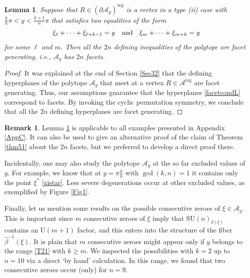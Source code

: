 \documentclass[a4paper,11pt,reqno]{amsart}
\newtheorem{lem}[thm]{Lemma}
\theoremstyle{definition}
\newtheorem{rem}[thm]{Remark}
\numberwithin{equation}{section}
\newcommand{\be}{\begin{equation}}
\newcommand{\ee}{\end{equation}}
\def\cA{{\mathcal A}}                       %
\def\reg{\mathrm{reg}}                      %
\def\SU{\mathrm{SU}}                        %
\def\U{\mathrm{U}}                          %
\def\reg{\mathrm{reg}}                      %
\begin{document}
\begin{lem}\label{facetlemL}
Suppose that $R \in (\partial \cA_y)^\reg$ is a vertex in a type (ii) case with $\frac{k}{n} \pi < y < \frac{k+1}{n}\pi $ that satisfies
two equalities of the form
\be
\xi_\ell+\cdots + \xi_{\ell +k-1} =y
\quad\hbox{and}\quad
\xi_m + \cdots + \xi_{m+k} = y
\label{facetcondL}\ee
for some $\ell$ and $m$. Then all the $2n$ defining inequalities of the polytope are facet generating, i.e., $\cA_y$ has $2n$ facets.
\end{lem}
\begin{proof}
It was explained at the end of Section \ref{Sec32}
that the defining hyperplanes of the polytope $\cA_y$ that meet at a vertex $R\in \cA^\reg$ are facet generating.
Thus, our assumptions   guarantee that the hyperplanes \eqref{facetcondL} correspond to facets.
By invoking the cyclic permutation symmetry, we conclude that all the $2n$ defining hyperplanes are facet generating.
\end{proof}



\begin{rem}
  Lemma \ref{facetlemL} is applicable to all examples presented in Appendix \ref{AppC}.
It can also be used to give an alternative proof of the claim of Theorem \ref{thm51} about the $2n$ facets, but
we preferred to develop a direct proof there.
\end{rem}


Incidentally, one may also study the polytope $\cA_y$ at the so far excluded values of $y$.
For example,  we know that at $y = \pi \frac{k}{n}$ with $\gcd(k,n)=1$  it contains only  the point $\xi^*$ \eqref{xistar}.
Less severe degenerations occur at other excluded values, as exemplified by Figure \ref{Fig1}.

Finally, let us mention some results on the possible consecutive zeroes of $\xi\in \cA_y$.
This is important since $m$ consecutive zeroes of $\xi$ imply that $\SU(n)_{\delta(\xi)}$ contains
an $\U(m+1)$ factor, and this enters into the structure of the fiber $\hat \beta^{-1}(\xi)$.
It is plain that $m$ consecutive zeroes might appear only if $y$ belongs to the range  \eqref{T21}  with $k \geq m$.
We inspected the possibilities with $k=2$ up to $n=10$  via a direct `by hand' calculation.
In this range, we found that two consecutive zeroes occur (only) for $n=9$.
\end{document}
